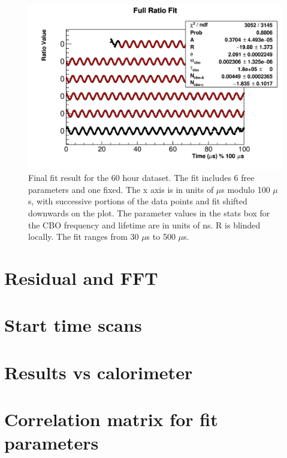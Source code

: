 \begin{figure}[h]
	\centering
	\includegraphics[width=\textwidth]{ratioCBO_moduloPlot}
    \caption[ratioCBO_moduloPlot]{Final fit result for the 60 hour dataset. The fit includes 6 free parameters and one fixed. The x axis is in units of $\mu$s modulo 100 $\mu$s, with successive portions of the data points and fit shifted downwards on the plot. The parameter values in the stats box for the CBO frequency and lifetime are in units of ns. R is blinded locally. The fit ranges from 30 $\mu$s to 500 $\mu$s.}
    \label{fig:ratioCBO_moduloPlot}
\end{figure}



\section{Residual and FFT}




\section{Start time scans}


\section{Results vs calorimeter}



\section{Correlation matrix for fit parameters}




